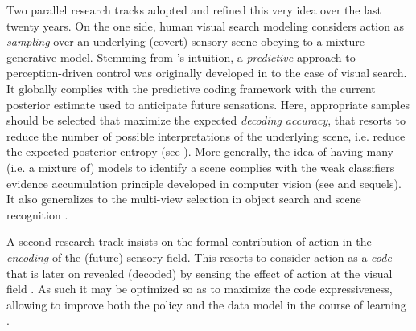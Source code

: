 \documentclass[12pt,twoside,openright]{article}
\begin{document}
Two parallel research tracks adopted and refined this very idea over the last twenty years.
On the one side, human visual search modeling considers action as  \emph{sampling} over an underlying (covert) sensory scene obeying to a mixture generative model. 
Stemming from \cite{bajcsy1988active}'s intuition, a \emph{predictive} approach to perception-driven control was originally developed in \cite{najemnik2005optimal} to the case of visual search.
It globally complies with the predictive coding framework \cite{rao1999predictive} with the current posterior estimate used to anticipate future sensations. 
Here, appropriate samples should be selected that maximize the expected \emph{decoding accuracy}, that resorts to reduce the number of possible interpretations of the underlying scene, i.e. reduce the expected posterior entropy (see \cite{najemnik2005optimal,najemnik2009simple,butko2010infomax,friston2012perceptions}).
More generally, the idea of having many (i.e. a mixture of) models to identify a scene complies with the weak classifiers evidence accumulation principle developed in computer vision (see \cite{viola2003fast} and sequels). It also generalizes to the multi-view selection in object search and scene recognition \cite{potthast2016active}.

A second research track insists on the formal contribution of action in the \emph{encoding} of the (future) sensory field. This resorts to consider action as a \emph{code} that is later on revealed (decoded) by sensing the effect of action at the visual field \cite{klyubin2005empowerment,tishby2011information}. As such it may be optimized so as to maximize the code expressiveness, allowing to improve both the policy and the data model in the course of learning \cite{schmidhuber2007simple,mohamed2015variational,houthooft2016vime}.
\end{document}
